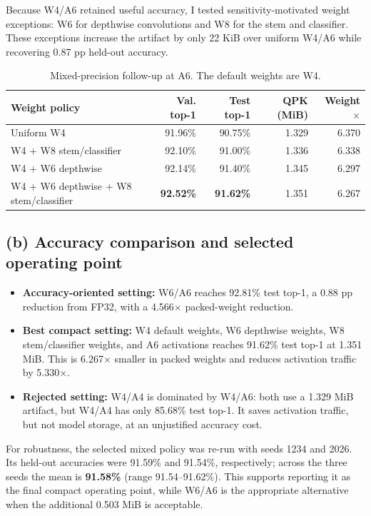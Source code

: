 Because W4/A6 retained useful accuracy, I tested sensitivity-motivated weight
exceptions: W6 for depthwise convolutions and W8 for the stem and classifier.
These exceptions increase the artifact by only 22 KiB over uniform W4/A6 while
recovering 0.87 pp held-out accuracy.

\begin{table}[H]
    \centering
    \small
    \caption{Mixed-precision follow-up at A6. The default weights are W4.}
    \label{tab:q3-mixed-sweep}
    \begin{tabular}{lrrrr}
        \toprule
        Weight policy & Val. top-1 & Test top-1 & QPK (MiB) & Weight $\times$ \\
        \midrule
        Uniform W4 & 91.96\% & 90.75\% & 1.329 & 6.370 \\
        W4 + W8 stem/classifier & 92.10\% & 91.00\% & 1.336 & 6.338 \\
        W4 + W6 depthwise & 92.14\% & 91.40\% & 1.345 & 6.297 \\
        W4 + W6 depthwise + W8 stem/classifier & \textbf{92.52\%} & \textbf{91.62\%} & 1.351 & 6.267 \\
        \bottomrule
    \end{tabular}
\end{table}

\subsection{(b) Accuracy comparison and selected operating point}

\begin{itemize}
    \item \textbf{Accuracy-oriented setting:} W6/A6 reaches 92.81\% test
    top-1, a 0.88 pp reduction from FP32, with a 4.566$\times$ packed-weight
    reduction.
    \item \textbf{Best compact setting:} W4 default weights, W6 depthwise
    weights, W8 stem/classifier weights, and A6 activations reaches 91.62\%
    test top-1 at 1.351 MiB. This is 6.267$\times$ smaller in packed weights
    and reduces activation traffic by 5.330$\times$.
    \item \textbf{Rejected setting:} W4/A4 is dominated by W4/A6: both use a
    1.329 MiB artifact, but W4/A4 has only 85.68\% test top-1. It saves
    activation traffic, but not model storage, at an unjustified accuracy cost.
\end{itemize}

For robustness, the selected mixed policy was re-run with seeds 1234 and
2026. Its held-out accuracies were 91.59\% and 91.54\%, respectively; across
the three seeds the mean is \textbf{91.58\%} (range 91.54--91.62\%). This
supports reporting it as the final compact operating point, while W6/A6 is the
appropriate alternative when the additional 0.503 MiB is acceptable.

